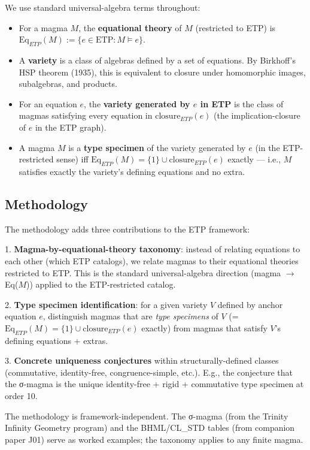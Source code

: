 \documentclass[11pt,reqno]{amsart}
\theoremstyle{plain}
\theoremstyle{definition}
\begin{document}
We use standard universal-algebra terms throughout:
\begin{itemize}
\item For a magma $M$, the \textbf{equational theory} of $M$ (restricted to ETP) is $\mathrm{Eq}_{ETP}(M) := \{e \in \mathrm{ETP} : M \models e\}$.
\item A \textbf{variety} is a class of algebras defined by a set of equations. By Birkhoff's HSP theorem (1935), this is equivalent to closure under homomorphic images, subalgebras, and products.
\item For an equation $e$, the \textbf{variety generated by $e$ in ETP} is the class of magmas satisfying every equation in $\mathrm{closure}_{ETP}(e)$ (the implication-closure of $e$ in the ETP graph).
\item A magma $M$ is a \textbf{type specimen} of the variety generated by $e$ (in the ETP-restricted sense) iff $\mathrm{Eq}_{ETP}(M) = \{1\} \cup \mathrm{closure}_{ETP}(e)$ exactly --- i.e., $M$ satisfies exactly the variety's defining equations and no extra.
\end{itemize}

\subsection{Methodology}

The methodology adds three contributions to the ETP framework:

1. \textbf{Magma-by-equational-theory taxonomy}: instead of relating equations to each other (which ETP catalogs), we relate magmas to their equational theories restricted to ETP. This is the standard universal-algebra direction (magma $\to$ Eq($M$)) applied to the ETP-restricted catalog.

2. \textbf{Type specimen identification}: for a given variety $V$ defined by anchor equation $e$, distinguish magmas that are \textit{type specimens} of $V$ (= $\mathrm{Eq}_{ETP}(M) = \{1\} \cup \mathrm{closure}_{ETP}(e)$ exactly) from magmas that satisfy $V$'s defining equations + extras.

3. \textbf{Concrete uniqueness conjectures} within structurally-defined classes (commutative, identity-free, congruence-simple, etc.). E.g., the conjecture that the σ-magma is the unique identity-free + rigid + commutative type specimen at order 10.

The methodology is framework-independent. The σ-magma (from the Trinity Infinity Geometry program) and the BHML/CL_STD tables (from companion paper J01) serve as worked examples; the taxonomy applies to any finite magma.
\end{document}
